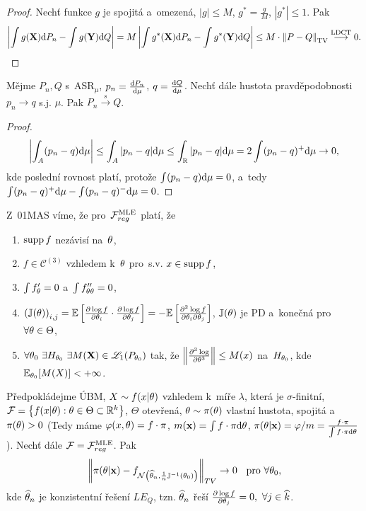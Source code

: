 \begin{proof}
	Nechť funkce $g$ je spojitá a~omezená, $|g|\leq M$, $g^\ast =\frac{g}{M}$, $|g^\ast|\leq 1$. Pak
	$$ \left| \int g(\textbf{X})\mathrm{d} P_n-\int g(\textbf{Y})\mathrm{d} Q \right|=M\left| \int g^\ast(\textbf{X})\mathrm{d} P_n-\int g^\ast(\textbf{Y})\mathrm{d} Q \right|\leq M\cdot \left\| P-Q\right\|_{\mathrm{TV}} \stackrel{\text{LDCT}}{\longrightarrow} 0.$$
\end{proof}
\begin{theorem}
	Mějme $P_n,Q$ s~ASR$_\mu$, $p_n=\frac{\mathrm{d} P_n}{\mathrm{d} \mu}$, $q=\frac{\mathrm{d} Q}{\mathrm{d} \mu}$. Nechť dále hustota pravděpodobnosti $p_n\to q$ s.j. $\mu$. Pak $P_n\stackrel{s}{\longrightarrow}Q$. 
	\begin{proof}
		$$ \left| \int_A (p_n-q)\mathrm{d}\mu \right|\leq \int_A|p_n-q|\mathrm{d}\mu\leq \int_{\mathbb{R}}|p_n-q|\mathrm{d}\mu=2\int(p_n-q)^+\mathrm{d}\mu\to0,$$
		kde poslední rovnost platí, protože $\int(p_n-q)\mathrm{d}\mu=0$, a~tedy $\int(p_n-q)^+\mathrm{d}\mu-\int(p_n-q)^-\mathrm{d}\mu=0$.	\end{proof}
\end{theorem}
\begin{remark} Z~01MAS víme, že pro~$\mathcal{F}_{reg}^{\mathrm{{\footnotesize MLE }}}$ platí, že \begin{enumerate}[1)]
		\item $\mathop{\mathrm{supp}} f$ nezávisí na~$\theta$,
		\item $f\in\mathcal{C}^{(3)}$ vzhledem k~$\theta$ pro~s.v. $x\in\mathop{\mathrm{supp}} f$,
		\item $\int f_\theta'=0$ a~$\int f_{\theta\theta}''=0$,
		\item $\left( \mathbb{J}(\theta) \right)_{i,j}=\mathbb{E}\left[ \frac{\partial\log f}{\partial \theta_i}\cdot\frac{\partial\log f}{\partial \theta_j} \right]=-\mathbb{E}\left[ \frac{\partial^2 \log f}{\partial\theta_i \partial \theta_j} \right]$, $\mathbb{J}(\theta)$ je PD a~konečná pro~$\forall\theta\in\Theta$,
		\item $\forall\theta_0~\exists H_{\theta_0}~\exists M(\textbf{X})\in\mathscr{L}_1(P_{\theta_0})$ tak, že $\left\| \frac{\partial^3\log }{\partial \theta^3}\right\|\leq M(x)$ na~$H_{\theta_0}$, kde $\mathbb{E}_{\theta_0}[M(X)]<+\infty$.
	\end{enumerate}
\end{remark}
\begin{theorem}
	Předpokládejme ÚBM, $X\sim f(x|\theta)$ vzhledem k~míře $\lambda$, která je $\sigma$-finitní, $\mathcal{F}=\left\{ f(x|\theta):\theta\in\Theta\subset \mathbb{R}^k \right\}$, $\Theta$ otevřená, $\theta\sim\pi(\theta)$ vlastní hustota, spojitá a~$\pi(\theta)>0$ (Tedy máme $\varphi(x,\theta)=f\cdot\pi$, $m(\textbf{x})=\int f\cdot \pi\mathrm{d}\theta$, $\pi(\theta|\textbf{x})=\varphi/m=\frac{f\cdot\pi}{\int f\cdot\pi\mathrm{d}\theta}$). Nechť dále $\mathcal{F}=\mathcal{F}_{reg}^{\mathrm{{\footnotesize MLE }}}$. Pak
	$$ \left\| \pi(\theta|\textbf{x})-f_{\mathcal{N}\left( \widehat{\theta}_n,\frac{1}{n}\mathbb{J}^{-1}(\theta_0) \right)} \right\|_{TV}\to0 \hspace{0.2cm}\text{ pro~}\forall \theta_0,$$
	kde $\widehat{\theta}_n$ je konzistentní řešení $LE_Q$, tzn. $\widehat{\theta}_n$ řeší $\frac{\partial \log f}{\partial \theta_j}=0,~\forall j\in\widehat{k}$.
\end{theorem}
